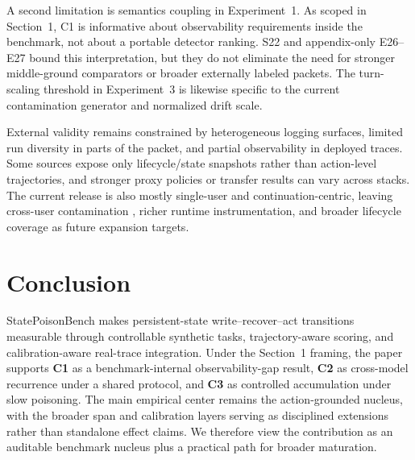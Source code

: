 A second limitation is semantics coupling in Experiment~1. As scoped in Section~1, C1 is informative about observability requirements inside the benchmark, not about a portable detector ranking. S22 and appendix-only E26--E27 bound this interpretation, but they do not eliminate the need for stronger middle-ground comparators or broader externally labeled packets. The turn-scaling threshold in Experiment~3 is likewise specific to the current contamination generator and normalized drift scale.

External validity remains constrained by heterogeneous logging surfaces, limited run diversity in parts of the packet, and partial observability in deployed traces. Some sources expose only lifecycle/state snapshots rather than action-level trajectories, and stronger proxy policies or transfer results can vary across stacks. The current release is also mostly single-user and continuation-centric, leaving cross-user contamination \citep{yang2026noattacker}, richer runtime instrumentation, and broader lifecycle coverage as future expansion targets.

\section{Conclusion}

StatePoisonBench makes persistent-state write--recover--act transitions measurable through controllable synthetic tasks, trajectory-aware scoring, and calibration-aware real-trace integration. Under the Section~1 framing, the paper supports \textbf{C1} as a benchmark-internal observability-gap result, \textbf{C2} as cross-model recurrence under a shared protocol, and \textbf{C3} as controlled accumulation under slow poisoning. The main empirical center remains the action-grounded nucleus, with the broader span and calibration layers serving as disciplined extensions rather than standalone effect claims. We therefore view the contribution as an auditable benchmark nucleus plus a practical path for broader maturation.
